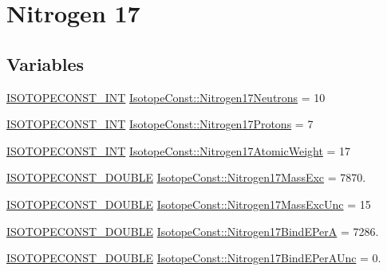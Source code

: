 \hypertarget{group___isotope_const-_nitrogen-_n17}{}\section{Nitrogen 17}
\label{group___isotope_const-_nitrogen-_n17}
\subsection*{Variables}
\begin{DoxyCompactItemize}
\item 
\mbox{\hyperlink{group___isotope_const-_macros_ga5f18360b3e99483a35c32d789e62621c}{I\+S\+O\+T\+O\+P\+E\+C\+O\+N\+S\+T\+\_\+\+I\+NT}} \mbox{\hyperlink{group___isotope_const-_nitrogen-_n17_gabeb58414dcce856002885e3542dd3146}{Isotope\+Const\+::\+Nitrogen17\+Neutrons}} = 10
\item 
\mbox{\hyperlink{group___isotope_const-_macros_ga5f18360b3e99483a35c32d789e62621c}{I\+S\+O\+T\+O\+P\+E\+C\+O\+N\+S\+T\+\_\+\+I\+NT}} \mbox{\hyperlink{group___isotope_const-_nitrogen-_n17_gad322aa8866af4fa5014d4167db260174}{Isotope\+Const\+::\+Nitrogen17\+Protons}} = 7
\item 
\mbox{\hyperlink{group___isotope_const-_macros_ga5f18360b3e99483a35c32d789e62621c}{I\+S\+O\+T\+O\+P\+E\+C\+O\+N\+S\+T\+\_\+\+I\+NT}} \mbox{\hyperlink{group___isotope_const-_nitrogen-_n17_gacd721ae378ba38ecdf43a0a69a57ee52}{Isotope\+Const\+::\+Nitrogen17\+Atomic\+Weight}} = 17
\item 
\mbox{\hyperlink{group___isotope_const-_macros_ga8f45a7272ce02c0b4c65c44636ed719a}{I\+S\+O\+T\+O\+P\+E\+C\+O\+N\+S\+T\+\_\+\+D\+O\+U\+B\+LE}} \mbox{\hyperlink{group___isotope_const-_nitrogen-_n17_ga345fedbd7aa33e60198ca4ca8eec6518}{Isotope\+Const\+::\+Nitrogen17\+Mass\+Exc}} = 7870.
\item 
\mbox{\hyperlink{group___isotope_const-_macros_ga8f45a7272ce02c0b4c65c44636ed719a}{I\+S\+O\+T\+O\+P\+E\+C\+O\+N\+S\+T\+\_\+\+D\+O\+U\+B\+LE}} \mbox{\hyperlink{group___isotope_const-_nitrogen-_n17_ga85d1c175a9fe6f394d633f03b77573bb}{Isotope\+Const\+::\+Nitrogen17\+Mass\+Exc\+Unc}} = 15
\item 
\mbox{\hyperlink{group___isotope_const-_macros_ga8f45a7272ce02c0b4c65c44636ed719a}{I\+S\+O\+T\+O\+P\+E\+C\+O\+N\+S\+T\+\_\+\+D\+O\+U\+B\+LE}} \mbox{\hyperlink{group___isotope_const-_nitrogen-_n17_gac155f17c87be01d90f3550236cef4a2b}{Isotope\+Const\+::\+Nitrogen17\+Bind\+E\+PerA}} = 7286.
\item 
\mbox{\hyperlink{group___isotope_const-_macros_ga8f45a7272ce02c0b4c65c44636ed719a}{I\+S\+O\+T\+O\+P\+E\+C\+O\+N\+S\+T\+\_\+\+D\+O\+U\+B\+LE}} \mbox{\hyperlink{group___isotope_const-_nitrogen-_n17_ga35a46fc0d5192ae96f87175b6d0a8b40}{Isotope\+Const\+::\+Nitrogen17\+Bind\+E\+Per\+A\+Unc}} = 0.

\end{DoxyCompactItemize}
